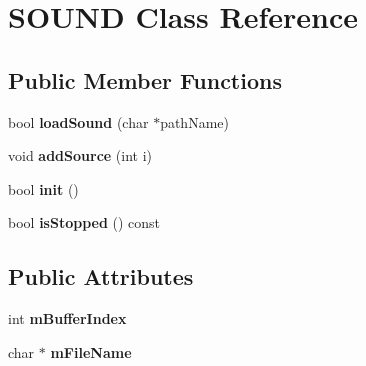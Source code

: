 \hypertarget{class_s_o_u_n_d}{
\section{SOUND Class Reference}
\label{class_s_o_u_n_d}
}
\subsection*{Public Member Functions}
\begin{DoxyCompactItemize}
\item 
\hypertarget{class_s_o_u_n_d_ab9e20f9f885d8b3a277ac5237d1ceabf}{
bool {\bfseries loadSound} (char $\ast$pathName)}
\label{class_s_o_u_n_d_ab9e20f9f885d8b3a277ac5237d1ceabf}

\item 
\hypertarget{class_s_o_u_n_d_a086a7a114bb3ddddb1f3f6908a9f114e}{
void {\bfseries addSource} (int i)}
\label{class_s_o_u_n_d_a086a7a114bb3ddddb1f3f6908a9f114e}

\item 
\hypertarget{class_s_o_u_n_d_a9874a1ab004717156585656243974bc9}{
bool {\bfseries init} ()}
\label{class_s_o_u_n_d_a9874a1ab004717156585656243974bc9}

\item 
\hypertarget{class_s_o_u_n_d_aa90a94637b030b7e6dbdfeee65cc7d20}{
bool {\bfseries isStopped} () const }
\label{class_s_o_u_n_d_aa90a94637b030b7e6dbdfeee65cc7d20}

\end{DoxyCompactItemize}
\subsection*{Public Attributes}
\begin{DoxyCompactItemize}
\item 
\hypertarget{class_s_o_u_n_d_a9ce14516de07c6c6c9c370815fe9e467}{
int {\bfseries mBufferIndex}}
\label{class_s_o_u_n_d_a9ce14516de07c6c6c9c370815fe9e467}

\item 
\hypertarget{class_s_o_u_n_d_a23db6da1d79da30db5f1697d9cbea68b}{
char $\ast$ {\bfseries mFileName}}
\label{class_s_o_u_n_d_a23db6da1d79da30db5f1697d9cbea68b}

\end{DoxyCompactItemize}
